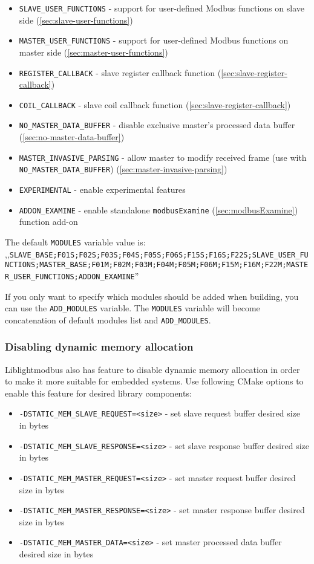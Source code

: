 \documentclass[11pt,a4paper]{article}
\newcommand{\coderef}[1]{\texttt{{#1}} (\ref{sec:#1})}
\begin{document}
\begin{itemize}
	\item\texttt{SLAVE\_USER\_FUNCTIONS} - support for user-defined Modbus functions on slave side (\ref{sec:slave-user-functions})
	\item\texttt{MASTER\_USER\_FUNCTIONS} - support for user-defined Modbus functions on master side (\ref{sec:master-user-functions})
	\item\texttt{REGISTER\_CALLBACK} - slave register callback function (\ref{sec:slave-register-callback})
	\item\texttt{COIL\_CALLBACK} - slave coil callback function (\ref{sec:slave-register-callback})
	\item\texttt{NO\_MASTER\_DATA\_BUFFER} - disable exclusive master's processed data buffer (\ref{sec:no-master-data-buffer})
	\item\texttt{MASTER\_INVASIVE\_PARSING} - allow master to modify received frame (use with \texttt{NO\_MASTER\_DATA\_BUFFER}) (\ref{sec:master-invasive-parsing})
	\item\texttt{EXPERIMENTAL} - enable experimental features
	
	\item\texttt{ADDON\_EXAMINE} - enable standalone \coderef{modbusExamine} function add-on
\end{itemize}
 
 The default \texttt{MODULES} variable value is: ,,\texttt{SLAVE\_BASE;F01S;F02S;F03S;F04S;F05S;F06S;F15S;F16S;F22S;\allowbreak SLAVE\_USER\_FUNCTIONS;MASTER\_BASE;F01M;F02M;F03M;F04M;F05M;F06M;\allowbreak F15M;F16M;F22M;\break MASTER\_USER\_FUNCTIONS;ADDON\_EXAMINE}'' \newline
 
 If you only want to specify which modules should be added when building, you can use the \texttt{ADD\_MODULES} variable. The \texttt{MODULES} variable will become concatenation of default modules list and \texttt{ADD\_MODULES}.
 
\subsubsection{Disabling dynamic memory allocation}
\par Liblightmodbus also has feature to disable dynamic memory allocation in order to make it more suitable for embedded systems. Use following CMake options to enable this feature for desired library components:
\begin{itemize}
	\setlength\itemsep{0em}
	\item\texttt{-DSTATIC\_MEM\_SLAVE\_REQUEST=<size>} - set slave request buffer desired size in bytes
	\item\texttt{-DSTATIC\_MEM\_SLAVE\_RESPONSE=<size>} - set slave response buffer desired size in bytes
	\item\texttt{-DSTATIC\_MEM\_MASTER\_REQUEST=<size>} - set master request buffer desired size in bytes
	\item\texttt{-DSTATIC\_MEM\_MASTER\_RESPONSE=<size>} - set master response buffer desired size in bytes
	\item\texttt{-DSTATIC\_MEM\_MASTER\_DATA=<size>} - set master processed data buffer desired size in bytes
\end{itemize}
\end{document}
